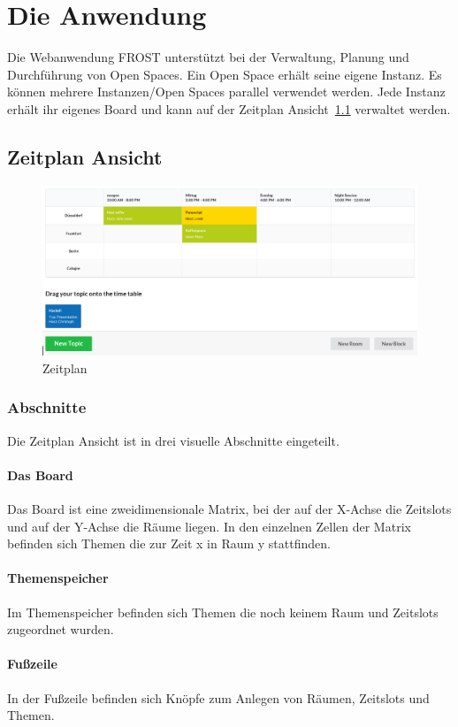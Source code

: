 \chapter{Die Anwendung}
\label{cha:die-anwendung}
Die Webanwendung FROST unterstützt bei der Verwaltung, Planung und Durchführung
von Open Spaces. Ein Open Space erhält seine eigene Instanz. Es können mehrere
Instanzen/Open Spaces parallel verwendet werden. Jede Instanz erhält ihr
eigenes Board und kann auf der Zeitplan Ansicht~\ref{sec:zeitplan-ansicht}
verwaltet werden.

\section{Zeitplan Ansicht}
\label{sec:zeitplan-ansicht}
\begin{figure}[ht]
  \centering
  \includegraphics[width=\textwidth]{fig/timetable.png}
  \caption{Zeitplan}
\end{figure}

\subsection{Abschnitte}
Die Zeitplan Ansicht ist in drei visuelle Abschnitte eingeteilt.
\subsubsection*{Das Board}
Das Board ist eine zweidimensionale Matrix, bei der auf der X-Achse die
Zeitslots und auf der Y-Achse die Räume liegen. In den einzelnen Zellen der
Matrix befinden sich Themen die zur Zeit x in Raum y stattfinden.
\subsubsection*{Themenspeicher}
Im Themenspeicher befinden sich Themen die noch keinem Raum und Zeitslots
zugeordnet wurden.
\subsubsection*{Fußzeile}
In der Fußzeile befinden sich Knöpfe zum Anlegen von Räumen, Zeitslots und
Themen.
